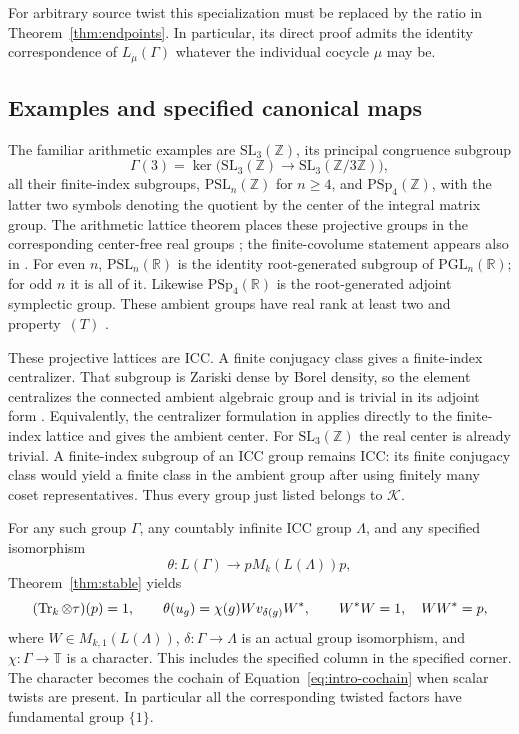 For arbitrary source twist this specialization must be replaced by the
ratio in Theorem~\ref{thm:endpoints}. In particular, its direct proof
admits the identity correspondence of $L_\mu(\Gamma)$ whatever the
individual cocycle $\mu$ may be.

\subsection{Examples and specified canonical maps}

The familiar arithmetic examples are
$\mathrm{SL}_3(\mathbb Z)$, its principal congruence subgroup
\[
 \Gamma(3)=\ker\bigl(\mathrm{SL}_3(\mathbb Z)
                    \longrightarrow\mathrm{SL}_3(\mathbb Z/3\mathbb Z)\bigr),
\]
all their finite-index subgroups, $\mathrm{PSL}_n(\mathbb Z)$ for
$n\geq4$, and $\mathrm{PSp}_4(\mathbb Z)$, with the latter two
symbols denoting the quotient by the center of the integral matrix
group. The arithmetic lattice theorem places these projective groups in
the corresponding center-free real groups \cite{BorelHarishChandra1962}; the finite-covolume statement appears also in
\cite[Theorem~1(iv)]{BorelHarishChandra1961}.
For even $n$, $\mathrm{PSL}_n(\mathbb R)$ is the identity root-generated
subgroup of $\mathrm{PGL}_n(\mathbb R)$; for odd $n$ it is all of it.
Likewise $\mathrm{PSp}_4(\mathbb R)$ is the root-generated adjoint
symplectic group. These ambient groups have real rank at least two and
property~$(T)$ \cite{BHV2008}.

These projective lattices are ICC. A finite conjugacy class gives a
finite-index centralizer. That subgroup is Zariski dense by Borel density,
so the element centralizes the connected ambient algebraic group and is
trivial in its adjoint form \cite{Borel1960}. Equivalently, the centralizer formulation in
\cite[Corollary~3]{Furstenberg1976} applies directly to the finite-index
lattice and gives the ambient center. For
$\mathrm{SL}_3(\mathbb Z)$ the real center is already trivial.
A finite-index subgroup of an ICC group remains ICC: its finite
conjugacy class would yield a finite class in the ambient group after
using finitely many coset representatives. Thus every group just listed
belongs to $\mathscr K$.

For any such group $\Gamma$, any countably infinite ICC group $\Lambda$,
and any specified isomorphism
\[
 \theta:L(\Gamma)\longrightarrow pM_k(L(\Lambda))p,
\]
Theorem~\ref{thm:stable} yields
\[
 (\operatorname{Tr}_k\otimes\tau)(p)=1,\qquad
 \theta(u_g)=\chi(g)Wv_{\delta(g)}W^*,\qquad
 W^*W=1,\quad WW^*=p,
\]
where $W\in M_{k,1}(L(\Lambda))$,
$\delta:\Gamma\to\Lambda$ is an actual group isomorphism, and
$\chi:\Gamma\to\mathbb T$ is a character. This includes the
specified column in the specified corner. The character becomes the
cochain of Equation~\eqref{eq:intro-cochain} when scalar twists are
present. In particular all the corresponding twisted factors have
fundamental group $\{1\}$.

